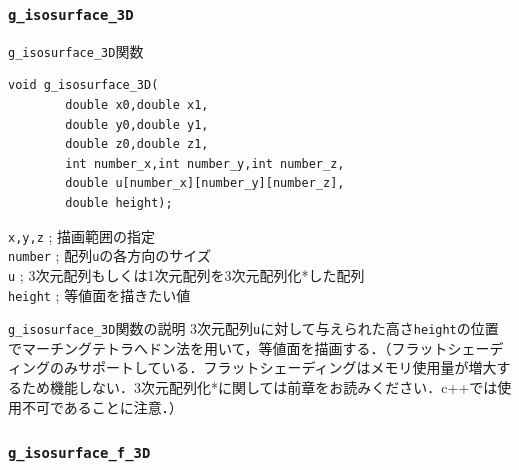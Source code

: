 \documentclass[a4paper,12pt]{jsarticle}%
\begin{document}
\clearpage
\subsubsection{\texttt{g\_isosurface\_3D}}

\begin{itembox}[l]{\texttt{g\_isosurface\_3D}関数}
\begin{verbatim}
void g_isosurface_3D(
        double x0,double x1,
        double y0,double y1,        
        double z0,double z1,
        int number_x,int number_y,int number_z,
        double u[number_x][number_y][number_z],
        double height);
\end{verbatim}
\verb|x,y,z| ; 描画範囲の指定\\
\verb|number| ; 配列\verb|u|の各方向のサイズ\\
\verb|u| ; 3次元配列もしくは1次元配列を3次元配列化*した配列\\
\verb|height| ; 等値面を描きたい値\\
\end{itembox}

\begin{itembox}[l]{\texttt{g\_isosurface\_3D}関数の説明}
3次元配列\verb|u|に対して与えられた高さ\verb|height|の位置でマーチングテトラへドン法を用いて，等値面を描画する．（フラットシェーディングのみサポートしている．フラットシェーディングはメモリ使用量が増大するため機能しない．3次元配列化*に関しては前章をお読みください．c++では使用不可であることに注意．）
\end{itembox}

\begin{figure}[htb]
\end{figure}




\clearpage
\subsubsection{\texttt{g\_isosurface\_f\_3D}}
\end{document}
